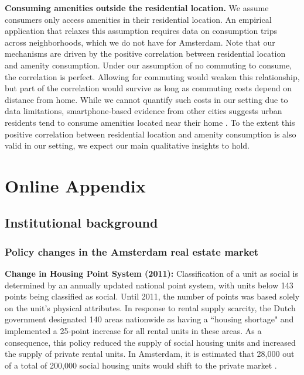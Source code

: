 \documentclass[11pt]{article}
\newcommand{\Paragraph}{\vspace{0.1cm}\noindent\textbf}
\begin{document}
\Paragraph{Consuming amenities outside the residential location.} We assume consumers only access amenities in their residential location. An empirical application that relaxes this assumption requires data on consumption trips across neighborhoods, which we do not have for Amsterdam. Note that our mechanisms are driven by the positive correlation between residential location and amenity consumption. Under our assumption of no commuting to consume, the correlation is perfect. Allowing for commuting would weaken this relationship, but part of the correlation would survive as long as commuting costs depend on distance from home. While we cannot quantify such costs in our setting due to data limitations, smartphone-based evidence from other cities  suggests urban residents tend to consume amenities located near their home \citep{miyauchi2021consumption, allen2021tourism}. To the extent this positive correlation between residential location and amenity consumption is also valid in our setting, we expect our main qualitative insights to hold.

\setlength{\bibsep}{0pt}
{\footnotesize}

\appendix
\section{Online Appendix}

\onehalfspacing
\subsection{Institutional background}\label{sec: appendix institutional}

\subsubsection{Policy changes in the Amsterdam real estate market}\label{sec: appendix policy changes}

\Paragraph{Change in Housing Point System (2011):} Classification of a unit as social is determined by an annually updated national point system, with units below 143 points being classified as social. Until 2011, the number of points was based solely on the unit's physical attributes. In response to rental supply scarcity, the Dutch government designated 140 areas nationwide as having a ``housing shortage" and implemented a 25-point increase for all rental units in these areas. As a consequence, this policy reduced the supply of social housing units and increased the supply of private rental units. In Amsterdam, it is estimated that 28,000 out of a total of 200,000 social housing units would shift to the private market  \citep{van_perlo_alle_2011}. 
\end{document}
